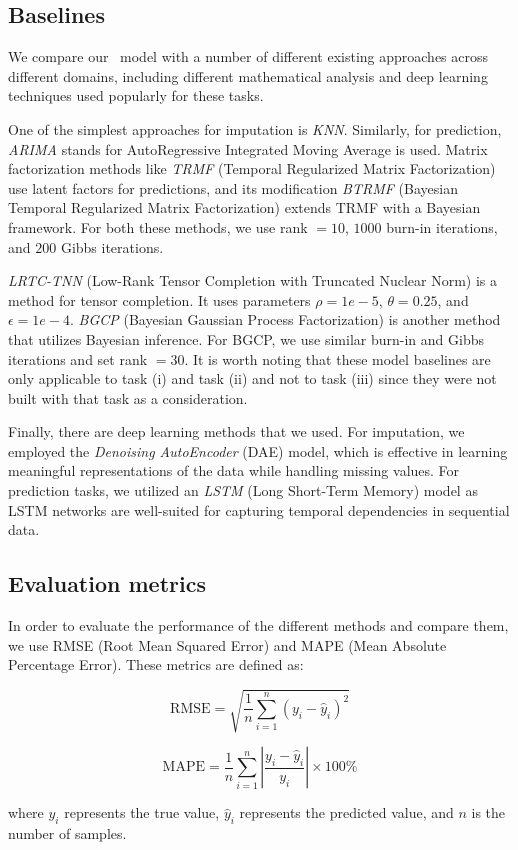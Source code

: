 \subsection{Baselines}

We compare our \name\ model with a number of different existing approaches across different domains, including different mathematical analysis and deep learning techniques used popularly for these tasks.

One of the simplest approaches for imputation is \textit{KNN}. Similarly, for prediction, \textit{ARIMA}\cite{arima} stands for AutoRegressive Integrated Moving Average is used. Matrix factorization methods like \textit{TRMF}\cite{trmf} (Temporal Regularized Matrix Factorization) use latent factors for predictions, and its modification \textit{BTRMF}\cite{btrmf} (Bayesian Temporal Regularized Matrix Factorization) extends TRMF with a Bayesian framework. For both these methods, we use rank $= 10$, $1000$ burn-in iterations, and $200$ Gibbs iterations.

\textit{LRTC-TNN}\cite{lrtc} (Low-Rank Tensor Completion with Truncated Nuclear Norm) is a method for tensor completion. It uses parameters $\rho = 1e-5$, $\theta = 0.25$, and $\epsilon = 1e-4$. \textit{BGCP} (Bayesian Gaussian Process Factorization) is another method that utilizes Bayesian inference. For BGCP, we use similar burn-in and Gibbs iterations and set rank $= 30$. It is worth noting that these model baselines are only applicable to task (i) and task (ii) and not to task (iii) since they were not built with that task as a consideration.

Finally, there are deep learning methods that we used. For imputation, we employed the \textit{Denoising AutoEncoder} (DAE)\cite{dae} model, which is effective in learning meaningful representations of the data while handling missing values. For prediction tasks, we utilized an \textit{LSTM}\cite{lstm} (Long Short-Term Memory) model as LSTM networks are well-suited for capturing temporal dependencies in sequential data.

\subsection{Evaluation metrics}

In order to evaluate the performance of the different methods and compare them, we use RMSE (Root Mean Squared Error) and MAPE (Mean Absolute Percentage Error). These metrics are defined as:


\[
\text{RMSE} = \sqrt{\frac{1}{n} \sum_{i=1}^{n} (y_i - \hat{y}_i)^2}
\]

\[
\text{MAPE} = \frac{1}{n} \sum_{i=1}^{n} \left| \frac{y_i - \hat{y}_i}{y_i} \right| \times 100\%
\]

where \( y_i \) represents the true value, \( \hat{y}_i \) represents the predicted value, and \( n \) is the number of samples.